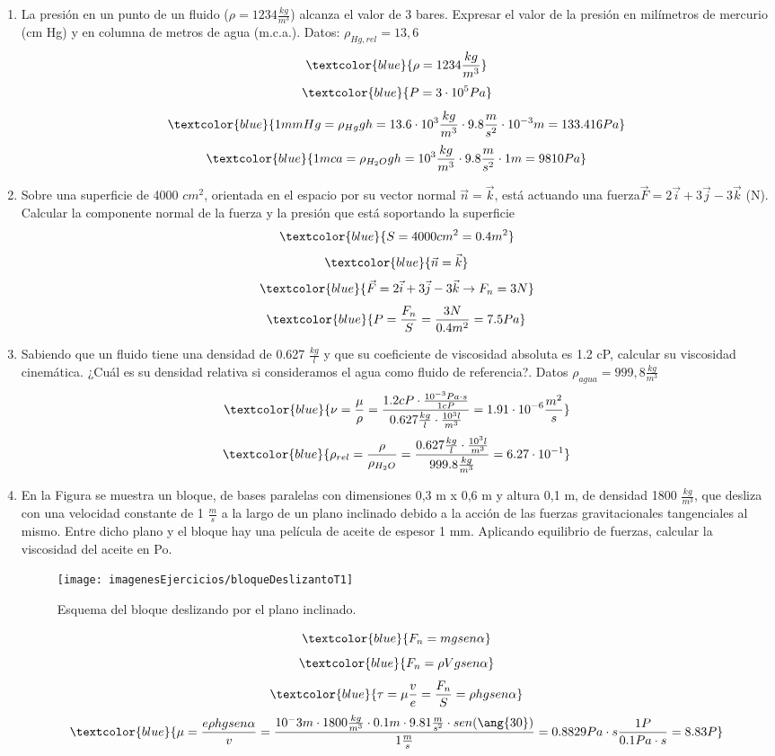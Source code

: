 \begin{enumerate}
\begin{figure}[H]
\begin{minipage}{0.3\textwidth}
	\end{minipage}
\end{figure}

	\newpage
	\item La presión en un punto de un fluido ($\rho = 1234 \frac{kg}{m^3}$) alcanza el valor de 3 bares. Expresar
	el valor de la presión en milímetros de mercurio (cm Hg) y en columna de metros de agua
	(m.c.a.). Datos: $\rho_{Hg,rel} = 13,6$
	\[\textcolor{blue}{\rho = 1234 \frac{kg}{m^3}}\]
	\[\textcolor{blue}{P=3\cdot10^5 Pa}\]
	\[\textcolor{blue}{1mmHg=\rho_{Hg}g h=13.6\cdot10^3\frac{kg}{m^3} \cdot9.8 \frac{m}{s^2}\cdot10^{-3}m=133.416Pa} \]
	\[\textcolor{blue}{1mca=\rho_{H_2O}g h=10^3\frac{kg}{m^3}\cdot9.8 \frac{m}{s^2}\cdot1m=9810Pa}\]
	\item Sobre una superficie de 4000 $cm^2$, orientada en el espacio por su vector normal $\vec{n}=\vec{k}$, está
	actuando una fuerza$\vec{F}=2\vec{i}+3\vec{j}-3\vec{k}$ (N). Calcular la componente normal de la fuerza y
	la presión que está soportando la superficie
		\[\textcolor{blue}{S=4000 cm^2=0.4 m^2}\]
	\[\textcolor{blue}{\vec{n}=\vec{k}}\]
	\[\textcolor{blue}{\vec{F}=2\vec{i}+3\vec{j}-3\vec{k} \rightarrow F_n=3N}\]
	\[\textcolor{blue}{P=\frac{F_n}{S}=\frac{3 N}{0.4 m^2}=7.5Pa}\]
	
	\item Sabiendo que un fluido tiene una densidad de 0.627 $\frac{kg}{l}$ y que su coeficiente de viscosidad
	absoluta es 1.2 cP, calcular su viscosidad cinemática. ¿Cuál es su densidad relativa si
	consideramos el agua como fluido de referencia?. Datos $\rho_{agua} = 999,8\frac{kg}{m^3}$
\[\textcolor{blue}{\nu = \frac{\mu}{\rho}=\frac{1.2 cP \cdot \frac{10^{-3} Pa \cdot s}{1 cP}}{0.627 \frac{kg}{l}\cdot\frac{10^3 l}{m^3}}=1.91\cdot10^{-6}\frac{m^2}{s}}\]
\[\textcolor{blue}{\rho_{rel}=\frac{\rho}{\rho_{H_2O}}=\frac{0.627 \frac{kg}{l}\cdot\frac{10^3 l}{m^3}}{999.8 \frac{kg}{m^3}}=6.27\cdot10^{-1}}\]
	
	\newpage
	\item En la Figura se muestra un bloque, de bases paralelas con dimensiones 0,3 m x 0,6
	m y altura 0,1 m, de densidad 1800 $\frac{kg}{m^3}$, que desliza con una velocidad constante de
	1 $\frac{m}{s}$ a la largo de un plano inclinado debido a la acción de las fuerzas gravitacionales
	tangenciales al mismo. Entre dicho plano y el bloque hay una película de aceite de espesor
	1 mm. Aplicando equilibrio de fuerzas, calcular la viscosidad del aceite en Po.
	\begin{figure}[H]
		
		\centering
		\texttt{[image: imagenesEjercicios/bloqueDeslizantoT1]}
		\caption{Esquema del bloque deslizando por el plano inclinado.}
		\label{fig:bloquedeslizantot1}
	\end{figure}
	\[\textcolor{blue}{F_n=m g sen\alpha}\]
	\[\textcolor{blue}{F_n=\rho V g sen\alpha}\]
	\[\textcolor{blue}{\tau=\mu\frac{v}{e}=\frac{F_n}{S}=\rho h g sen\alpha}\]
	\[\textcolor{blue}{\mu=\frac{e\rho h g sen\alpha}{v}=\frac{10^-3m\cdot1800\frac{kg}{m^3}\cdot0.1m\cdot 9.81 \frac{m}{s^2} \cdot sen(\ang{30})}{1\frac{m}{s}}=0.8829Pa\cdot s\frac{1 P}{0.1 Pa \cdot s}=8.83P}\]
\end{enumerate}
\newpage
